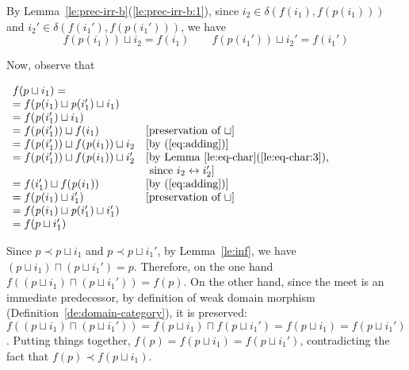 \documentclass[conference]{IEEEtran}
\renewenvironment{proof}{\begin{IEEEproof}}{\end{IEEEproof}}
\newcommand{\diff}[2]{\ensuremath{\delta({#1},{#2})}}
\newcommand{\pred}[1]{\ensuremath{\mathit{p}({#1})}}
\begin{document}
\begin{proof}
\begin{itemize}
\begin{enumerate}[A.]
      By Lemma~\ref{le:prec-irr-b}(\ref{le:prec-irr-b:1}), since
      $i_2 \in \diff{f(i_1)}{f(\pred{i_1})}$ and
      $i_2' \in \diff{f(i_1')}{f(\pred{i_1'})}$, we have
      \begin{equation}
        \label{eq:adding}
        f(\pred{i_1}) \sqcup i_2 = f(i_1) 
        \qquad f(\pred{i_1'}) \sqcup i_2' = f(i_1')
      \end{equation}
          
      Now, observe that
      \begin{center}
      $\begin{array}{lll}
         f(p \sqcup i_1)  =  \\
         = f(\pred{i_1} \sqcup \pred{i_1'} \sqcup i_1)\\
         =  f(\pred{i_1'} \sqcup i_1)\\
         =  f(\pred{i_1'}) \sqcup f(i_1) 
      & \mbox{[preservation of $\sqcup$]}\\
         =  f(\pred{i_1'}) \sqcup f(\pred{i_1}) \sqcup i_2 
      & \mbox{[by~(\ref{eq:adding})]}\\
         =   f(\pred{i_1'}) \sqcup f(\pred{i_1}) \sqcup i_2' 
      & \mbox{[by Lemma~\ref{le:eq-char}(\ref{le:eq-char:3}),} \\
         & \mbox{\ since $i_2 \leftrightarrow i_2'$]}\\
                          =  f(i_1') \sqcup f(\pred{i_1}) 
         & \mbox{[by~(\ref{eq:adding})]}\\
                          =  f(\pred{i_1} \sqcup i_1')
         & \mbox{[preservation of $\sqcup$]}\\
                          =  f(\pred{i_1} \sqcup \pred{i_1'} \sqcup  i_1')\\
                          =  f(p \sqcup  i_1')\\
       \end{array}
       $
     \end{center}
     Since $p \prec p \sqcup i_1$ and $p \prec p \sqcup i_1'$, by
     Lemma~\ref{le:inf}, we have
     $(p \sqcup i_1) \sqcap (p \sqcup i_1') = p$.
     Therefore, on the one hand
     $f((p \sqcup i_1) \sqcap (p \sqcup i_1')) = f(p)$. On the other
     hand, since the meet is an immediate predecessor, by definition
     of weak domain morphism (Definition~\ref{de:domain-category}), it
     is preserved:
     $f((p \sqcup i_1) \sqcap (p \sqcup i_1')) = f(p \sqcup i_1)
     \sqcap f(p \sqcup i_1') = f(p \sqcup i_1) = f(p \sqcup i_1')$.
     Putting things together,
     $f(p) = f(p \sqcup i_1) = f(p \sqcup i_1')$, contradicting  the
     fact that $f(p) \prec f(p \sqcup i_1)$.
   \end{enumerate}
 

\end{itemize}
\end{proof}
\end{document}
